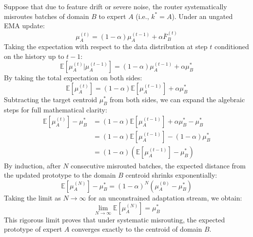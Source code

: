 \documentclass{article}
\theoremstyle{plain}
\theoremstyle{definition}
\theoremstyle{remark}
\begin{document}
Suppose that due to feature drift or severe noise, the router systematically misroutes batches of domain $B$ to expert $A$ (i.e., $k^* = A$). Under an ungated EMA update:
\begin{equation}
    \mu_A^{(t)} = (1-\alpha)\mu_A^{(t-1)} + \alpha \bar{F}_B^{(t)}
\end{equation}
Taking the expectation with respect to the data distribution at step $t$ conditioned on the history up to $t-1$:
\begin{equation}
    \mathbb{E}[\mu_A^{(t)} | \mu_A^{(t-1)}] = (1-\alpha)\mu_A^{(t-1)} + \alpha \mu_B^*
\end{equation}
By taking the total expectation on both sides:
\begin{equation}
    \mathbb{E}[\mu_A^{(t)}] = (1-\alpha)\mathbb{E}[\mu_A^{(t-1)}] + \alpha \mu_B^*
\end{equation}
Subtracting the target centroid $\mu_B^*$ from both sides, we can expand the algebraic steps for full mathematical clarity:
\begin{align}
    \mathbb{E}[\mu_A^{(t)}] - \mu_B^* &= (1-\alpha)\mathbb{E}[\mu_A^{(t-1)}] + \alpha \mu_B^* - \mu_B^* \nonumber \\
    &= (1-\alpha)\mathbb{E}[\mu_A^{(t-1)}] - (1-\alpha)\mu_B^* \nonumber \\
    &= (1-\alpha)(\mathbb{E}[\mu_A^{(t-1)}] - \mu_B^*)
\end{align}
By induction, after $N$ consecutive misrouted batches, the expected distance from the updated prototype to the domain $B$ centroid shrinks exponentially:
\begin{equation}
    \mathbb{E}[\mu_A^{(N)}] - \mu_B^* = (1-\alpha)^N (\mu_A^{(0)} - \mu_B^*)
\end{equation}
Taking the limit as $N \to \infty$ for an unconstrained adaptation stream, we obtain:
\begin{equation}
    \lim_{N \to \infty} \mathbb{E}[\mu_A^{(N)}] = \mu_B^*
\end{equation}
This rigorous limit proves that under systematic misrouting, the expected prototype of expert $A$ converges exactly to the centroid of domain $B$. 
\end{document}

